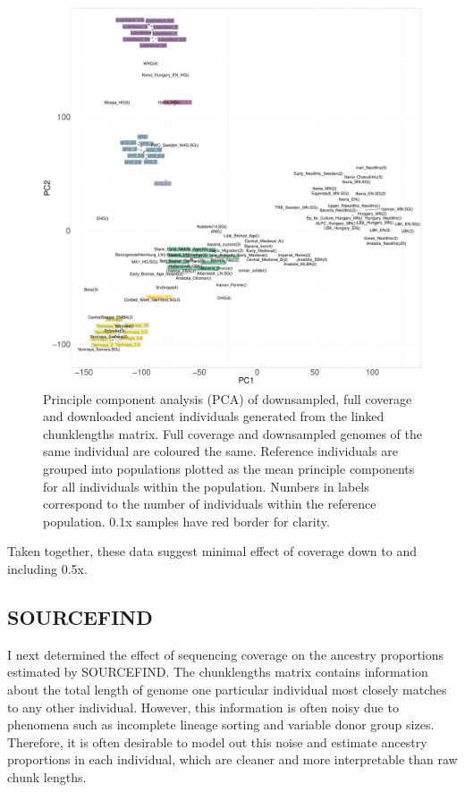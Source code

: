 \begin{figure}[htp]
    \centering
    \includegraphics[width=1.0\textwidth]{../images/chapter1/PCA_panel_allInds.allCoverage.pdf}
    \caption{Principle component analysis (PCA) of downsampled, full coverage and downloaded ancient individuals generated from the linked chunklengths matrix. Full coverage and downsampled genomes of the same individual are coloured the same. Reference individuals are grouped into populations plotted as the mean principle components for all individuals within the population. Numbers in labels correspond to the number of individuals within the reference population. 0.1x samples have red border for clarity.}
    \label{fig:PCA_panel_allInds_allCoverage}
\end{figure}

Taken together, these data suggest minimal effect of coverage down to and including 0.5x.

\subsection{SOURCEFIND}

I next determined the effect of sequencing coverage on the ancestry proportions estimated by SOURCEFIND. The chunklengths matrix contains information about the total length of genome one particular individual most closely matches to any other individual. However, this information is often noisy due to phenomena such as incomplete lineage sorting and variable donor group sizes. Therefore, it is often desirable to model out this noise and estimate ancestry proportions in each individual, which are cleaner and more interpretable than raw chunk lengths. 

